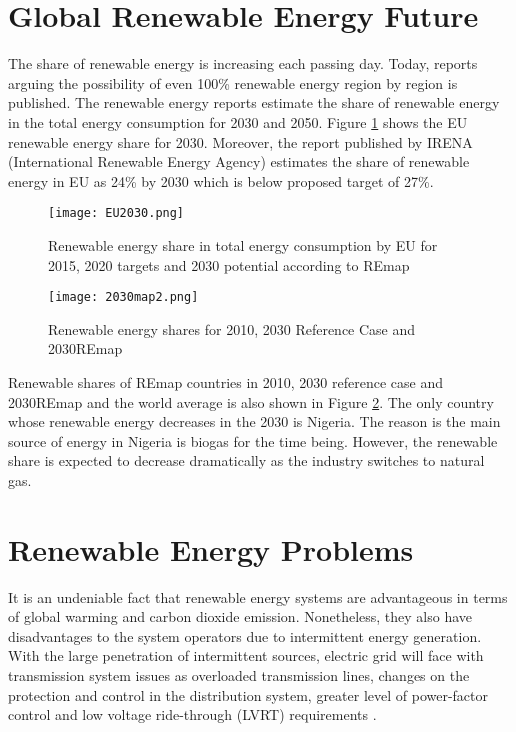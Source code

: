 \section{Global Renewable Energy Future}
The share of renewable energy is increasing each passing day. Today, reports arguing the possibility of even 100\% renewable energy region by region is published\cite{REN212017d}. The renewable energy reports estimate the share of renewable energy in the total energy consumption for 2030 and 2050. Figure \ref{EU2030} shows the EU renewable energy share for 2030. Moreover, the report published by IRENA (International Renewable Energy Agency) estimates the share of renewable energy in EU as 24\% by 2030 which is below proposed target of 27\%\cite{IRENA2014}.
\begin{figure}[h!]
	\centering
	\texttt{[image: EU2030.png]}
	\caption{Renewable energy share in total energy consumption by EU for 2015, 2020 targets and 2030 potential according to REmap \cite{EuropeanCommission2018}}
	\label{EU2030}
\end{figure}


\begin{figure}[h!]
	\centering
	\texttt{[image: 2030map2.png]}
	\caption{Renewable energy shares for 2010, 2030 Reference Case and 2030REmap \cite{IRENA2014}}
	\label{2030map}
\end{figure}
Renewable shares of REmap countries in 2010, 2030 reference case and 2030REmap and the world average is also shown in Figure \ref{2030map}. The only country whose renewable energy decreases in the 2030 is Nigeria. The reason is the main source of energy in Nigeria is biogas for the time being. However, the renewable share is expected to decrease dramatically as the industry switches to natural gas.

\section{Renewable Energy Problems}
It is an undeniable fact that renewable energy systems are advantageous in terms of global warming and carbon dioxide emission. Nonetheless, they also have disadvantages to the system operators due to intermittent energy generation. With the large penetration of intermittent sources, electric grid will face with transmission system issues as overloaded transmission lines, changes on the protection and control in the distribution system, greater level of power-factor control and low voltage ride-through (LVRT) requirements \cite{Ipakchi2009}.

